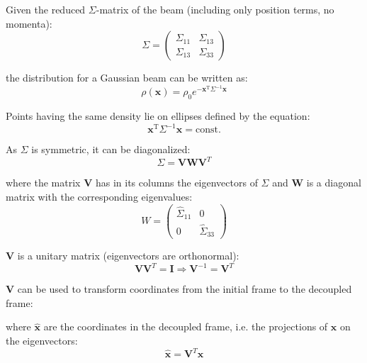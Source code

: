 Given the reduced $\Sigma$-matrix of the beam (including only position terms, no momenta):
\begin{equation}
\Sigma = \left(
\begin{matrix}
{\Sigma}_{11} & {\Sigma}_{13}\\
{\Sigma}_{13} & {\Sigma}_{33}
\end{matrix}
\right)
\end{equation}



 the distribution for a Gaussian beam can be written as:
\begin{equation}
\rho(\textbf{x}) = \rho_0 e^{-\textbf{x}^{\mathrm{T}} \Sigma^{-1}\textbf{x}}
\end{equation}

Points having the same density lie on ellipses defined by the equation:
\begin{equation}
\textbf{x}^\mathrm{T}\Sigma^{-1}\textbf{x} = \mathrm{const.}
\label{eqellipse2}
\end{equation}

As $\Sigma$ is symmetric, it can be diagonalized:
\begin{equation}
\Sigma = \textbf{V} \textbf{W} \textbf{V}^{T}
\label{diagsigma}
\end{equation}

where the matrix $\textbf{V}$ has in its columns the eigenvectors of $\Sigma$ and $\textbf{W}$ is a diagonal matrix with the corresponding eigenvalues:
\begin{equation}
W = \left(
\begin{matrix}
\hat{\Sigma}_{11} & 0\\
0 & \hat{\Sigma}_{33}
\end{matrix}
\right)
\end{equation}

 $\textbf{V}$ is a unitary matrix (eigenvectors are orthonormal):
\begin{equation}
\textbf{V} \textbf{V}^{T} = \textbf{I} \Rightarrow \textbf{V}^{-1} = \textbf{V}^{T}
\label{unitarity}
\end{equation}

\textbf{V} can be used to transform coordinates from the initial frame to the decoupled frame:

where $\hat{\textbf{x}}$ are the coordinates in the decoupled frame, i.e. the projections of $\textbf{x}$ on the eigenvectors:
\begin{equation}
\hat{\textbf{x}}= \textbf{V}^{T}\textbf{x}
\label{vartransform}
\end{equation}

